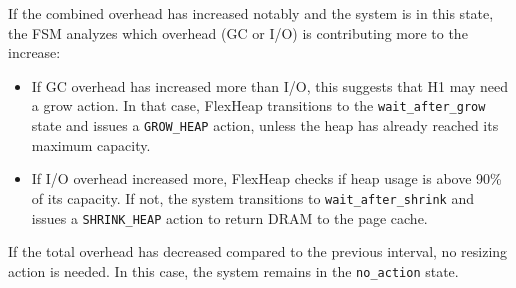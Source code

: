 If the combined overhead has increased notably and the system is in this state, the FSM analyzes which overhead (GC or I/O) is 
contributing more to the increase:
\begin{itemize}
  \item If GC overhead has increased more than I/O, this suggests that H1 may need a grow action. 
  In that case, FlexHeap transitions to the \texttt{wait\_after\_grow} state and issues a \texttt{GROW\_HEAP} action, 
  unless the heap has already reached its maximum capacity.

  \item If I/O overhead increased more, FlexHeap checks if heap usage is above 90\% of 
  its capacity. If not, the system transitions to \texttt{wait\_after\_shrink} and issues a \texttt{SHRINK\_HEAP} 
  action to return DRAM to the page cache.
\end{itemize}

If the total overhead has decreased compared to the previous interval, no resizing action is needed. In this case, 
the system remains in the \texttt{no\_action} state.
